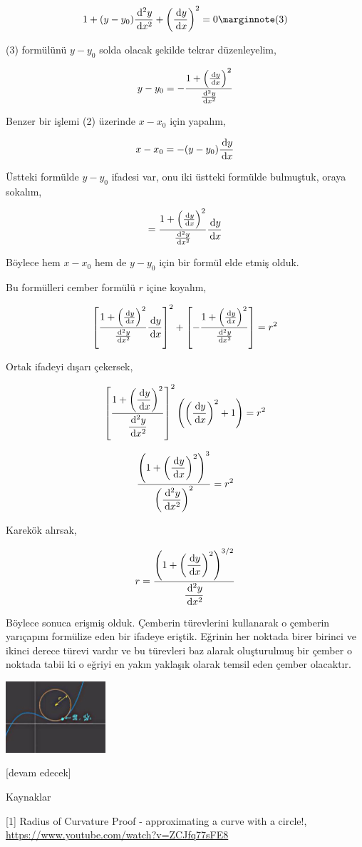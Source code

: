 \documentclass[12pt,fleqn]{article}\usepackage{../../common}
\begin{document}
$$
1 + (y-y_0) \frac{\ud^2y}{\ud x^2} +
\left( \frac{\ud y}{\ud x}  \right)^2 = 0
\mlabel{3}
$$

(3) formülünü $y-y_0$ solda olacak şekilde tekrar düzenleyelim,

$$
y-y_0 = - \frac{1 + \left( \frac{\,\mathrm{d} y}{\,\mathrm{d} x}  \right)^2}{\frac{\,\mathrm{d}^2y}{\,\mathrm{d} x^2}}
$$

Benzer bir işlemi (2) üzerinde $x-x_0$ için yapalım,

$$
x-x_0 = -(y-y_0)\frac{\,\mathrm{d} y}{\,\mathrm{d} x}
$$

Üstteki formülde $y-y_0$ ifadesi var, onu iki üstteki formülde bulmuştuk,
oraya sokalım,

$$
= \frac{1 + \left( \frac{\,\mathrm{d} y}{\,\mathrm{d} x}  \right)^2}{\frac{\,\mathrm{d}^2y}{\,\mathrm{d} x^2}}
\frac{\,\mathrm{d} y}{\,\mathrm{d} x}
$$

Böylece hem $x-x_0$ hem de $y-y_0$ için bir formül elde etmiş olduk.

Bu formülleri cember formülü $r$ içine koyalım,

$$
\left[
    \frac{1 + \left( \frac{\,\mathrm{d} y}{\,\mathrm{d} x}  \right)^2}
         {\frac{\,\mathrm{d}^2y}{\,\mathrm{d} x^2}} \frac{\,\mathrm{d} y}{\,\mathrm{d} x}
\right]^2
+
\left[
  - \frac{1 + \left( \frac{\,\mathrm{d} y}{\,\mathrm{d} x}  \right)^2}
         {\frac{\,\mathrm{d}^2y}{\,\mathrm{d} x^2}}
\right] = r^2
$$

Ortak ifadeyi dışarı çekersek, 

$$
\left[
    \dfrac{1 + \left( \dfrac{\,\mathrm{d} y}{\,\mathrm{d} x}  \right)^2}
         {\dfrac{\,\mathrm{d}^2y}{\,\mathrm{d} x^2}}
\right]^2
\left(  \left(\dfrac{\,\mathrm{d} y}{\,\mathrm{d} x}  \right)^2 + 1 \right) = r^2
$$

$$
\frac{\left( 1 +  \left( \dfrac{\,\mathrm{d} y}{\,\mathrm{d} x} \right)^2  \right)^3}
     { \left( \dfrac{\,\mathrm{d}^2y}{\,\mathrm{d} x^2}   \right)^2  }
     = r^2
$$

Karekök alırsak,

$$
r =
\frac{\left( 1 +  \left( \dfrac{\,\mathrm{d} y}{\,\mathrm{d} x} \right)^2  \right)^{3/2}}
     { \dfrac{\,\mathrm{d}^2y}{\,\mathrm{d} x^2}   }
$$


Böylece sonuca erişmiş olduk. Çemberin türevlerini kullanarak o çemberin
yarıçapını formülize eden bir ifadeye eriştik. Eğrinin her noktada birer birinci
ve ikinci derece türevi vardır ve bu türevleri baz alarak oluşturulmuş bir
çember o noktada tabii ki o eğriyi en yakın yaklaşık olarak temsil eden
çember olacaktır. 

\includegraphics[width=10em]{calc_multi_60_03.jpg}
     
[devam edecek]

Kaynaklar

[1] Radius of Curvature Proof - approximating a curve with a circle!,
    \url{https://www.youtube.com/watch?v=ZCJfq77sFE8}
\end{document}
